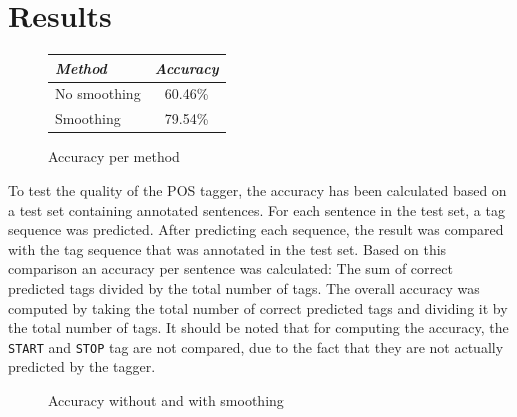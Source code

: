 \documentclass[titlepage,a4paper, 10pt]{article}
\begin{document}
\section{Results}
\begin{figure}
\begin{center}
\begin{tabular}{|l|c|}
    \hline
    \textit{Method} & \textit{Accuracy} \\
    \hline
    No smoothing    & 60.46\% \\
    Smoothing       & 79.54\% \\
    \hline
\end{tabular}
\end{center}
\caption{Accuracy per method}
\label{fig:smoothingaccuracytable}
\end{figure}

To test the quality of the POS tagger, the accuracy has been calculated based on a test set containing annotated sentences.
For each sentence in the test set, a tag sequence was predicted.
After predicting each sequence, the result was compared with the tag sequence that was annotated in the test set.
Based on this comparison an accuracy per sentence was calculated: The sum of correct predicted tags divided by the total number of tags.
The overall accuracy was computed by taking the total number of correct predicted tags and dividing it by the total number of tags.
It should be noted that for computing the accuracy, the \texttt{START} and \texttt{STOP} tag are not compared, due to the fact that they are not actually predicted by the tagger.

\begin{figure}
\begin{center}
\caption{Accuracy without and with smoothing}
\label{fig:smoothingaccuracybar}
\end{center}
\end{figure}
\end{document}
